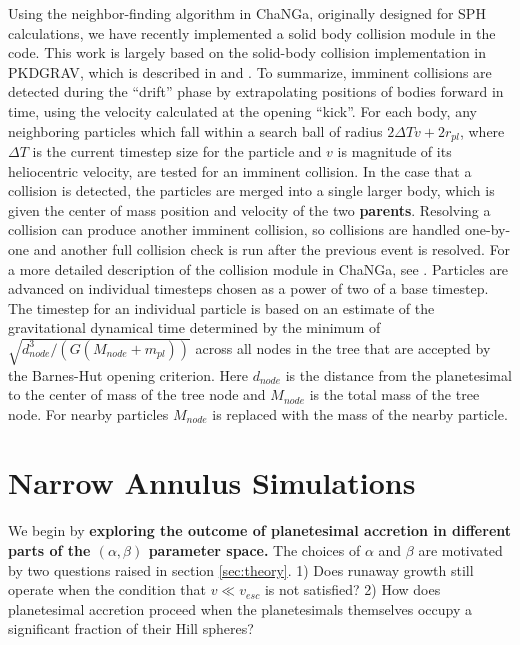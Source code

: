 \documentclass[twocolumn,linenumbers]{aastex63}
\begin{document}
Using the neighbor-finding algorithm in {\sc ChaNGa}, originally
designed for SPH calculations, we have recently implemented a solid
body collision module in the code.  This work is largely based on the
solid-body collision implementation in {\sc PKDGRAV}, which is
described in \citet{richardson94} and \citet{richardson00}. To
summarize, imminent collisions are detected during the ``drift'' phase
by extrapolating positions of bodies forward in time, using the
velocity calculated at the opening ``kick''. For each body, any
neighboring particles which fall within a search ball of radius
$2 \Delta T v + 2 r_{pl}$, where $\Delta T$ is the current timestep size
for the particle and $v$ is magnitude of its heliocentric velocity,
 are tested for an imminent collision. In the case that
a collision is detected, the particles are merged into a single larger
body, which is given the center of mass position and velocity of the
two \textbf{parents}. Resolving a collision can produce another imminent
collision, so collisions are handled one-by-one and another full
collision check is run after the previous event is resolved. For a
more detailed description of the collision module in {\sc ChaNGa}, see
\citep{wallace19}.
Particles are advanced on individual timesteps chosen as a
power of two of a base timestep.  The timestep for an individual
particle is based on an estimate of the gravitational dynamical time
determined by the minimum of $\sqrt{d_{node}^3/(G(M_{node} + m_{pl}))}$
across all nodes in the tree that are accepted by the Barnes-Hut
opening criterion.  Here $d_{node}$ is the distance from the
planetesimal to the center of mass of the tree node and $M_{node}$ is
the total mass of the tree node.  For nearby particles $M_{node}$ is
replaced with the mass of the nearby particle.

\section{Narrow Annulus Simulations}\label{sec:narrow}

We begin by 
\textbf{exploring the outcome of planetesimal accretion in different parts of the $\left( \alpha, \beta \right)$
parameter space.} The choices of $\alpha$ and $\beta$ are motivated by two questions raised in section \ref{sec:theory}. 1) Does
runaway growth still operate when the condition that $v \ll v_{esc}$
is not satisfied? 2) How does planetesimal accretion proceed when the planetesimals themselves occupy a significant fraction of 
their Hill spheres?
\end{document}
